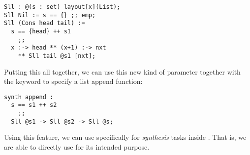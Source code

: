 \begin{lstlisting}
Sll : @(s : set) layout[x](List);
Sll Nil := s == {} ;; emp;
Sll (Cons head tail) :=
  s == {head} ++ s1
    ;;
  x :-> head ** (x+1) :-> nxt
    ** Sll tail @s1 [nxt];
\end{lstlisting}

\noindent
Putting this all together, we can use this new kind of parameter together with the \synth{} keyword to specify a list append function:

\begin{lstlisting}
synth append :
  s == s1 ++ s2
    ;;
  Sll @s1 -> Sll @s2 -> Sll @s;
\end{lstlisting}

\noindent
Using this feature, we can use \SuSLik{} specifically for \textit{synthesis} tasks inside \Pika. That is, we are able to directly use \SuSLik{} for its intended purpose.


